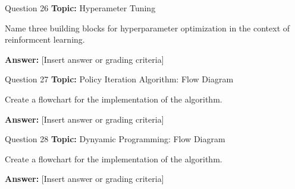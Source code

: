 \begin{frame}{Question 26}
    \textbf{Topic:} Hyperameter Tuning

    \vspace{10pt}
    Name three building blocks for hyperparameter optimization in the context of reinformcent learning.  
    \vspace{20pt}

    \textbf{Answer:} [Insert answer or grading criteria]
\end{frame}
\begin{frame}{Question 27}
    \textbf{Topic:} Policy Iteration Algorithm: Flow Diagram

    \vspace{10pt}
    Create a flowchart for the implementation of the algorithm. 
    \vspace{20pt}

    \textbf{Answer:} [Insert answer or grading criteria]
\end{frame}

\begin{frame}{Question 28}
    \textbf{Topic:} Dynyamic Programming: Flow Diagram

    \vspace{10pt}
    Create a flowchart for the implementation of the algorithm. 
    \vspace{20pt}

    \textbf{Answer:} [Insert answer or grading criteria]
\end{frame}

